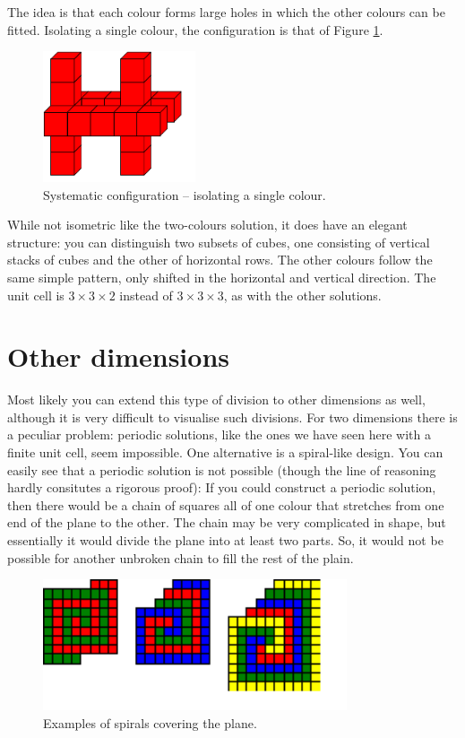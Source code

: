 \documentclass[onecolumn]{article}
\begin{document}
The idea is that each colour forms large holes in which the other colours can be fitted.
Isolating a single colour, the configuration is that of Figure \ref{systematic_configuration}.

\begin{figure}
\center
\caption{Systematic configuration -- isolating a single colour.}
\label{systematic_configuration}
\includegraphics[width=0.4\textwidth]{systematic_configuration.pdf}
\end{figure}

While not isometric like the two-colours solution, it does have an
elegant structure: you can distinguish two subsets of cubes, one
consisting of vertical stacks of cubes and the other of horizontal
rows. The other colours follow the same simple pattern, only shifted
in the horizontal and vertical direction. The unit cell is $3 \times 3 \times 2$
instead of $3 \times 3 \times 3$, as with the other solutions.

\section*{Other dimensions}
Most likely you can extend this type of division to other dimensions as well,
although it is very difficult to visualise such divisions. For two dimensions
there is a peculiar problem: periodic solutions, like the
ones we have seen here with a finite unit cell, seem impossible. One alternative
is a spiral-like design. You can easily see that a periodic solution is not
possible (though the line of reasoning hardly consitutes a rigorous proof):
If you could construct a periodic solution, then there would be a chain of squares
all of one colour that stretches from one end of the plane to the other. The chain
may be very complicated in shape, but essentially it would divide the plane into
at least two parts. So, it would not be possible for another unbroken chain to fill
the rest of the plain.

\begin{figure}
\center
\caption{Examples of spirals covering the plane.}
\label{squares_spiralling}
\includegraphics[width=0.8\textwidth]{squares_spiralling.pdf}
\end{figure}
\end{document}
